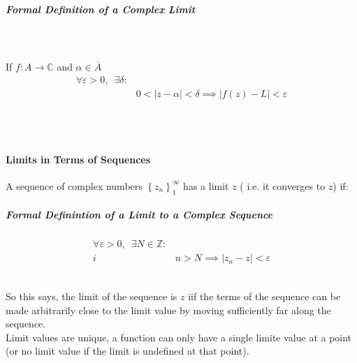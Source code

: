 \documentclass[class=article, crop=false]{standalone}
\begin{document}
\ \
\hfill\begin{minipage}{\dimexpr\textwidth-3cm}
\begin{tcolorbox}

  \subparagraph{Formal Definition of a Complex Limit}  \ \\
  \ \\
  If $f: A \rightarrow \mathbb{C} $ and $\alpha \in \overline{A}$ 
\begin{align*}
    \forall \varepsilon > 0, \enspace \exists \delta:& \\
    & 0 <     \left| z-\alpha \right| < \delta \implies     \left| f\left( z \right) - L \right| < \varepsilon
\end{align*}
\end{tcolorbox}

\end{minipage}
\\ \

\newpage 

\paragraph{Limits in Terms of Sequences}
A sequence of complex numbers $\left\{ z_n \right\}_{1}^{\infty}$ has a limit $z$ ( i.e. it converges to $z$) if:\\



\hfill\begin{minipage}{\dimexpr\textwidth-3cm}
\begin{tcolorbox}

  \subparagraph{Formal Definintion of a Limit to a Complex Sequence}
\begin{align*}
    \forall \varepsilon > 0, \enspace \exists N \in \mathbb{Z} :& \\
    i& n > N \implies     \left| z_n - z \right| < \varepsilon
\end{align*}
\end{tcolorbox}

\end{minipage}
\ \\

So this says, the limit of the sequence is $z$ iif the terms of the sequence can be made arbitrarily close to the limit value by moving sufficiently far along the sequence.\\


Limit values are unique, a function can only have a single limite value at a point (or no limit value if the limit is undefined at that point). \\
\end{document}

